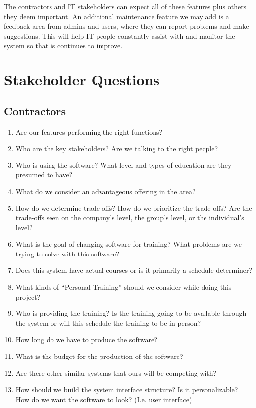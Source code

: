 \documentclass[12pt]{article}
\begin{document}
	The contractors and IT stakeholders can expect all of these features plus others they deem important.  An additional maintenance feature we may add is a feedback area from admins and users, where they can report problems and make suggestions. This will help IT people constantly assist with and monitor the system so that is continues to improve.

\section{Stakeholder Questions}
\subsection{Contractors}
\begin{enumerate}
\item Are our features performing the right functions?
\item Who are the key stakeholders? Are we talking to the right people?
\item Who is using the software? What level and types of education are they presumed to have?
\item What do we consider an advantageous offering in the area?
\item How do we determine trade-offs? How do we prioritize the trade-offs? Are the trade-offs seen on the company’s level, the group’s level, or the individual’s level?
\item What is the goal of changing software for training? What problems are we trying to solve with this software?
\item Does this system have actual courses or is it primarily a schedule determiner?
\item What kinds of “Personal Training” should we consider while doing this project?
\item Who is providing the training? Is the training going to be available through the system or will this schedule the training to be in person?
\item How long do we have to produce the software?
\item What is the budget for the production of the software?
\item Are there other similar systems that ours will be competing with?
\item How should we build the system interface structure? Is it personalizable? How do we want the software to look? (I.e. user interface)
\end{enumerate}
\end{document}
